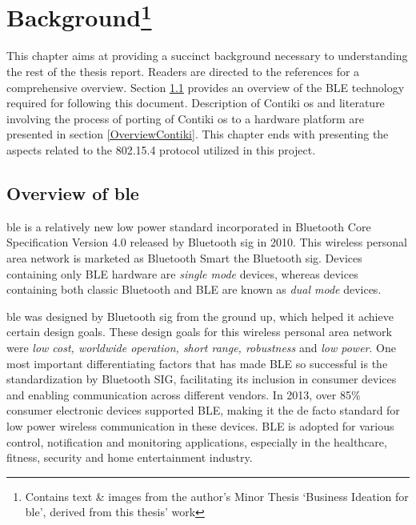 \chapter[Background]{Background\footnote{Contains text \& images from the author's Minor Thesis `Business Ideation for \gls{ble}', derived from this thesis' work}} \label{2Back}

This chapter aims at providing a succinct background necessary to understanding the rest of the thesis report. Readers are directed to the references for a comprehensive overview. Section \ref{OverviewBLE} provides an overview of the BLE technology required for following this document. Description of Contiki \gls{os} and literature involving the process of porting of Contiki \gls{os} to a hardware platform are presented in section \ref{OverviewContiki}. This chapter ends with presenting the aspects related to the 802.15.4 protocol utilized in this project.


\section{Overview of \texorpdfstring{\acrlong{ble}}{Bluetooth Low Energy}} \label{OverviewBLE}

\acrfull{ble} is a relatively new low power standard incorporated in Bluetooth Core Specification Version 4.0 released by Bluetooth \gls{sig} in 2010\cite{CoreSpec4.0}. This wireless personal area network is marketed as Bluetooth Smart the Bluetooth \gls{sig}. Devices containing only BLE hardware are \emph{single mode} devices, whereas devices containing both classic Bluetooth and BLE are known as \emph{dual mode} devices.   

\gls{ble} was designed by Bluetooth \gls{sig} from the ground up, which helped it achieve certain design goals. These design goals for this wireless personal area network were \emph{low cost, worldwide operation, short range, robustness} and \emph{low power}\cite{Heydon2012}. One most important differentiating factors that has made BLE so successful is the standardization by Bluetooth SIG, facilitating its inclusion in consumer devices and enabling communication across different vendors. In 2013, over 85\% consumer electronic devices supported BLE, making it the de facto standard for low power wireless communication in these devices\cite{Martin2014}. BLE is adopted for various control, notification and monitoring applications, especially in the healthcare, fitness, security and home entertainment industry. 

